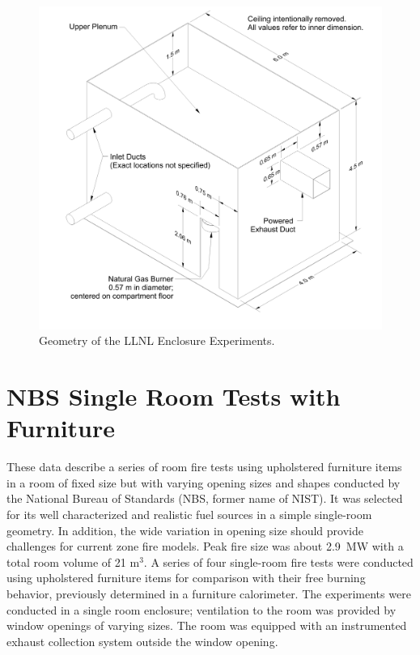 \begin{figure}[\figoptions{b}]
\begin{center}
\includegraphics[width=6.5in]{FIGURES/LLNL_Enclosure/LLNL_Enclosure_Drawing}
\end{center}
\caption[Geometry of the LLNL Enclosure Experiments]{Geometry of the LLNL Enclosure Experiments.}
\label{LLNL_Enclosure_Drawing}
\end{figure}

\section{NBS Single Room Tests with Furniture}

These data describe a series of room fire tests using upholstered furniture items in a room of fixed size but with varying opening sizes and shapes \cite{Valid:Babrauskas_Flashover} conducted by the National Bureau of Standards (NBS, former name of NIST). It was selected for its well characterized and realistic fuel sources in a simple single-room geometry. In addition, the wide variation in opening size should provide challenges for current zone fire models. Peak fire size was about 2.9~MW with a total room volume of 21 m$^3$. A series of four single-room fire tests were conducted using upholstered furniture items for comparison with their free burning behavior, previously determined in a furniture calorimeter.  The experiments were conducted in a single room enclosure; ventilation to the room was provided by window openings of  varying sizes. The room was equipped with an instrumented exhaust collection system outside the window opening.

